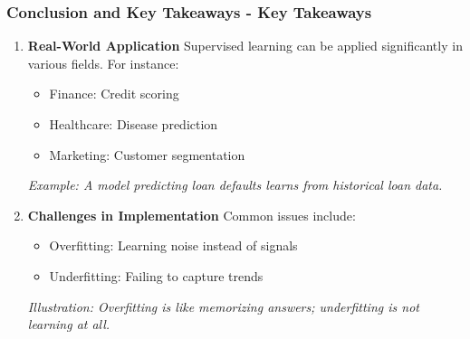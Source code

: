 \documentclass[aspectratio=169]{beamer}
\begin{document}
\begin{frame}[fragile]
    \frametitle{Conclusion and Key Takeaways - Key Takeaways}
    
    \begin{enumerate}
        \item \textbf{Real-World Application}  
            Supervised learning can be applied significantly in various fields. For instance:
            \begin{itemize}
                \item Finance: Credit scoring
                \item Healthcare: Disease prediction
                \item Marketing: Customer segmentation
            \end{itemize}
            \textit{Example: A model predicting loan defaults learns from historical loan data.}

        \item \textbf{Challenges in Implementation}  
            Common issues include:
            \begin{itemize}
                \item Overfitting: Learning noise instead of signals
                \item Underfitting: Failing to capture trends
            \end{itemize}
            \textit{Illustration: Overfitting is like memorizing answers; underfitting is not learning at all.}
    \end{enumerate}
\end{frame}
\end{document}
